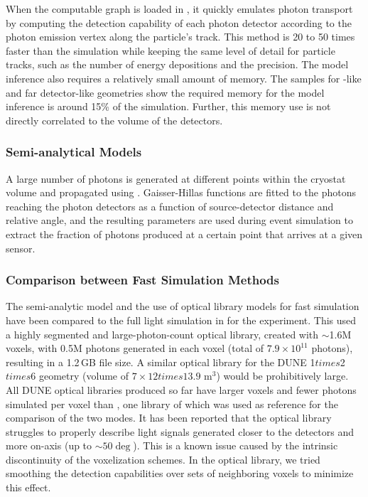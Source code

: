 \documentclass[../main-v1.tex]{subfiles}
\begin{document}
When the computable graph is loaded in , it quickly emulates photon transport by  computing the %
detection capability of each photon detector according to the photon emission vertex along the particle's track.
This method is 20 to 50 times faster than the  simulation while keeping the same level of detail for particle tracks, such as the number of energy depositions and the precision.
The model inference also requires a relatively small amount of memory. The samples for -like and %
far detector-like geometries show the required memory for the model inference is around 15\% of the  simulation. Further, this memory use is not directly correlated to the volume of the detectors. 

\subsubsection{Semi-analytical Models}
A large number of photons is generated at different points within the cryostat volume and propagated using . Gaisser-Hillas functions are fitted to the %
photons reaching the photon detectors as a function of source-detector distance and relative angle, and the resulting parameters are used during event simulation %
to extract the fraction of photons produced at a certain point that arrives at a given sensor.
 
\subsubsection{Comparison between Fast Simulation Methods}
The semi-analytic model and the use of  optical library models for fast simulation have been compared to the full light simulation in  for the  experiment. This used a highly segmented and large-photon-count optical library, created with $\sim$1.6M voxels, with 0.5M photons %
generated in each voxel (total of $7.9 \times  10^{11}$ photons), resulting in a  1.2\,GB file size. A similar optical library for the DUNE 1$times$2$times$6 geometry (volume of $7 \times 12 times 13.9$ m$^3$) would be prohibitively large.
All DUNE optical libraries produced so far have larger voxels and fewer photons simulated per voxel %
than , one library of which  was used as reference for the comparison of the two modes. It has been reported that the optical library struggles to properly describe light signals generated closer to the detectors and more on-axis (up to $\sim50\deg$). This is a known issue caused by the intrinsic discontinuity of the voxelization schemes. In the  optical library, %
we tried smoothing the detection capabilities over sets of neighboring voxels to minimize this effect.
\end{document}

